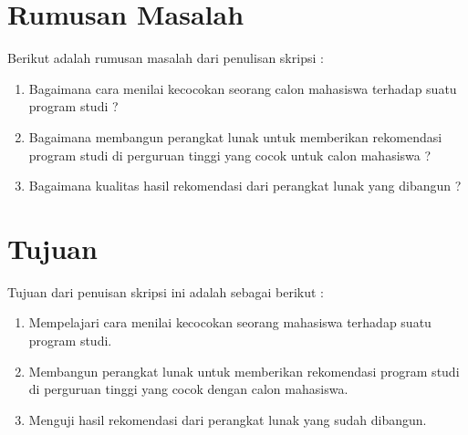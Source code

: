 
\section{Rumusan Masalah}
\label{sec:rumusan}
Berikut adalah rumusan masalah dari penulisan skripsi : \\

\begin{enumerate}
	\item Bagaimana cara menilai kecocokan seorang calon mahasiswa terhadap suatu program studi ?
	\item Bagaimana membangun perangkat lunak untuk memberikan rekomendasi program studi di perguruan tinggi yang cocok untuk calon mahasiswa ?
	\item Bagaimana kualitas hasil rekomendasi dari perangkat lunak yang dibangun ?
\end{enumerate}


\section{Tujuan}
\label{sec:tujuan}
Tujuan dari penuisan skripsi ini adalah sebagai berikut : \\

\begin{enumerate}
	\item Mempelajari cara menilai kecocokan seorang mahasiswa terhadap suatu program studi.
	\item Membangun perangkat lunak untuk memberikan rekomendasi program studi di perguruan tinggi yang cocok dengan calon mahasiswa.
	\item Menguji hasil rekomendasi dari perangkat lunak yang sudah dibangun.
\end{enumerate}


